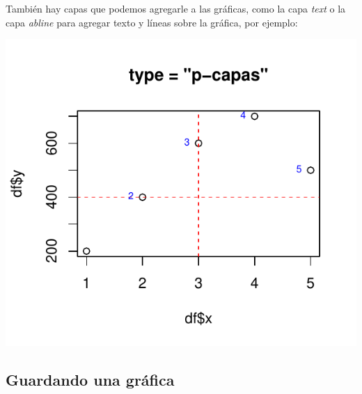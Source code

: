 \documentclass[
]{book}
\newenvironment{Shaded}{\begin{snugshade}}{\end{snugshade}}
\newcommand{\AttributeTok}[1]{\textcolor[rgb]{0.13,0.29,0.53}{#1}}
\newcommand{\DecValTok}[1]{\textcolor[rgb]{0.00,0.00,0.81}{#1}}
\newcommand{\FloatTok}[1]{\textcolor[rgb]{0.00,0.00,0.81}{#1}}
\newcommand{\FunctionTok}[1]{\textcolor[rgb]{0.13,0.29,0.53}{\textbf{#1}}}
\newcommand{\NormalTok}[1]{#1}
\newcommand{\SpecialCharTok}[1]{\textcolor[rgb]{0.81,0.36,0.00}{\textbf{#1}}}
\newcommand{\StringTok}[1]{\textcolor[rgb]{0.31,0.60,0.02}{#1}}
\begin{document}
También hay capas que podemos agregarle a las gráficas, como la capa \emph{text} o la capa \emph{abline} para agregar texto y líneas sobre la gráfica, por ejemplo:

\begin{Shaded}
\end{Shaded}

\begin{center}\includegraphics{_main_files/figure-latex/unnamed-chunk-200-1} \end{center}

\subsection{Guardando una gráfica}\label{guardando-una-gruxe1fica}
\end{document}
